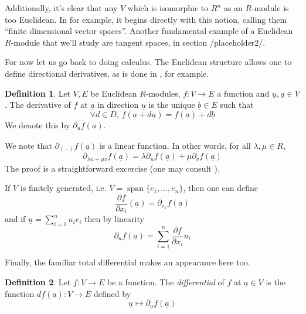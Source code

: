 \documentclass[11pt]{article}
\theoremstyle{definition}
\newtheorem{defn}{Definition}[section]
\newcommand{\ddx}[2]{\frac{\partial #1}{\partial #2}} %
\newcommand{\farg}{-} %
\renewcommand{\vec}{\underline} %
\DeclareMathOperator{\spn}{span}
\numberwithin{equation}{section}
\begin{document}
Additionally, it's clear that any \( V \) which is isomorphic to \( R^n \) as an \( R \)-module is too Euclidean. In \cite{kock10} for example, it begins directly with this notion, calling them ``finite dimensional vector spaces''. Another fundamental example of a Euclidean \( R \)-module that we'll study are tangent spaces, in section {/placeholder2/}.

For now let us go back to doing calculus. The Euclidean structure allows one to define directional derivatives, as is done in \cite{lav96}, for example.
\begin{defn}
  Let \( V,E \) be Euclidean \( R \)-modules, \( f:V\to E \) a function and \( \vec u, \vec a\in V \). The derivative of \( f \) at \( \vec a \) in direction \( \vec u \) is the unique \( \vec b\in E \) such that
  \begin{equation*}
    \forall d\in D,\, f(\vec a + d\vec u) = f(\vec a) + d\vec b
  \end{equation*}
  We denote this by \( \partial_{\vec u}f(a) \). 
\end{defn}

We note that \( \partial_{(\farg)}f(\vec a) \) is a linear function. In other words, for all \( \lambda,\mu \in R\),
\begin{equation*}
  \partial_{\lambda \vec u + \mu \vec v}f(\vec a) = \lambda\partial_{\vec u}f(\vec a) + \mu\partial_{\vec v}f(\vec a)
\end{equation*}
The proof is a straightforward excercise (one may consult \cite[p. 13]{lav96}).

If \( V \) is finitely generated, i.e. \( V = \spn{\{e_1,\dots,e_n\}} \), then one can define
\begin{equation*}
  \ddx{f}{x_i}(\vec a) = \partial_{e_1}f(\vec a)
\end{equation*}
and if \( \vec u = \sum_{i=1}^{n}{u_ie_i} \) then by linearity
\begin{equation*}
  \partial_{\vec u}f(\vec a) = \sum_{i=1}^{n}\ddx{f}{x_i}u_i
\end{equation*}

Finally, the familiar total differential makes an appearance here too.

\begin{defn}
  Let \( f:V\to E \) be a function. The \emph{differential} of \( f \) at \( \vec a\in V \) is the function \( df(\vec a):V\to E \) defined by
  \begin{equation*}
    \vec u\mapsto \partial_{\vec u}f(\vec a)
  \end{equation*}
\end{defn}
\end{document}
